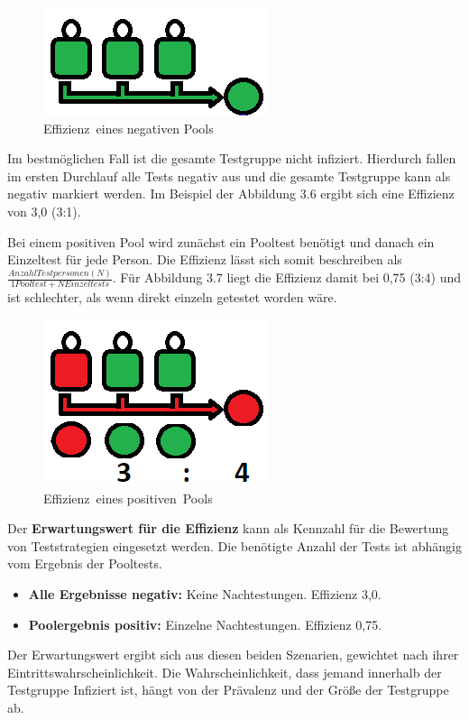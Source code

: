 \begin{figure}[h]
	\centering
	\includegraphics[width=.3\textwidth]{img/PoolAlleNegativ}
	\caption{\mbox{Effizienz eines} \mbox{negativen} Pools\footnotemark}
\end{figure}
Im bestmöglichen Fall ist die gesamte Testgruppe nicht infiziert.
Hierdurch fallen im ersten Durchlauf alle Tests negativ aus und die gesamte Testgruppe kann als negativ markiert werden.
Im Beispiel der Abbildung 3.6 ergibt sich eine Effizienz von 3,0 (3:1).

Bei einem positiven Pool wird zunächst ein Pooltest benötigt und danach ein Einzeltest für jede Person.
Die Effizienz lässt sich somit beschreiben als $\frac{Anzahl Testpersonen (N)}{1 Pooltest + N Einzeltests} $.
Für Abbildung 3.7 liegt die Effizienz damit bei 0,75 (3:4) und ist schlechter, als wenn direkt einzeln getestet worden wäre.

\begin{figure}[h]
	\centering
	\includegraphics[width=.3\textwidth]{img/EffizienzPositiv}
	\caption{\mbox{Effizienz eines} \mbox{positiven Pools}\footnotemark}
\end{figure}

Der \textbf{Erwartungswert für die Effizienz} kann als Kennzahl für die Bewertung von Teststrategien eingesetzt werden.
Die benötigte Anzahl der Tests ist abhängig vom Ergebnis der Pooltests.
\begin{itemize}
	\item \textbf{Alle Ergebnisse negativ:} Keine Nachtestungen. Effizienz 3,0. 
	\item \textbf{Poolergebnis positiv:} Einzelne Nachtestungen. Effizienz 0,75.
\end{itemize}
Der Erwartungswert ergibt sich aus diesen beiden Szenarien, gewichtet nach ihrer Eintrittswahrscheinlichkeit.
Die Wahrscheinlichkeit, dass jemand innerhalb der Testgruppe Infiziert ist, hängt von der Prävalenz und der Größe der Testgruppe ab.
\cleardoublepage
